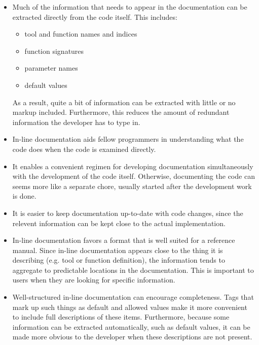 \begin{itemize}

\item Much of the information that needs to appear in the
documentation can be extracted directly from the code itself.  This
includes: 

\begin{itemize}
\item tool and function names and indices
\item function signatures
\item parameter names
\item default values
\end{itemize}

\noindent As a result, quite a bit of information can be extracted
with little or no markup included.  Furthermore, this reduces the
amount of redundant information the developer has to type in.  

\item In-line documentation aids fellow programmers in understanding
what the code does when the code is examined directly.

\item It enables a convenient regimen for developing documentation
simultaneously with the development of the code itself.  Otherwise,
documenting the code can seems more like a separate chore, usually
started after the development work is done.  

\item It is easier to keep documentation up-to-date with code changes,
since the relevent information can be kept close to the actual
implementation.  

\item In-line documentation favors a format that is well suited
for a reference manual.  Since in-line documentation appears close to
the thing it is describing (e.g. tool or function definition), the
information tends to aggregate to predictable locations in the
documentation.  This is important to users when they are looking for
specific information.  

\item Well-structured in-line documentation can encourage
completeness.  Tags that mark up such things as default and allowed
values make it more convenient to include full descriptions of these
items.  Furthermore, because some information can be extracted
automatically, such as default values, it can be made more obvious
to the developer when these descriptions are not present.  

\end{itemize}

